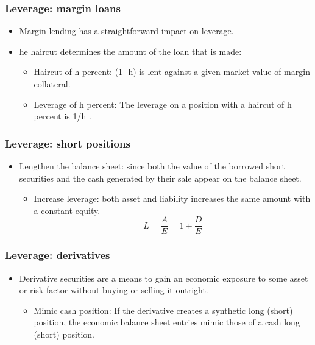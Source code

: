 \subsubsection{Leverage: margin loans}
\begin{itemize}
\item Margin lending has a straightforward impact on leverage.
\item he haircut determines the amount of the loan that is made:
    \begin{itemize}
    \item Haircut of h percent: (1- h) is lent against a given market value of margin collateral.
    \item Leverage of h percent: The leverage on a position with a haircut of h percent is 1/h .
    \end{itemize}
\end{itemize}


\subsubsection{Leverage: short positions}
\begin{itemize}
\item Lengthen the balance sheet: since both the value of the borrowed short securities and the cash generated by their sale appear on the balance sheet.
    \begin{itemize}
    \item Increase leverage: both asset and liability increases the same amount with a constant equity.
        \[
L = \frac{A}{E} = 1 + \frac{D}{E}
\]
    \end{itemize}
\end{itemize}



\subsubsection{Leverage: derivatives}
\begin{itemize}
\item Derivative securities are a means to gain an economic exposure to some asset or risk factor without buying or selling it outright.
    \begin{itemize}
    \item Mimic cash position: If the derivative creates a synthetic long (short) position, the economic balance sheet entries mimic those of a cash long (short) position.
    \end{itemize}
    
\end{itemize}



